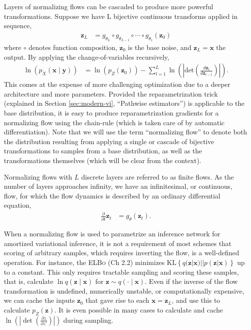 Layers of normalizing flows can be cascaded to produce more powerful transformations. Suppose we have L bijective continuous transforms applied in sequence,
\begin{align*}
	\mathbf{z}_L &= g_{\theta_L}\circ g_{\theta_{L-1}}\circ\cdots\circ g_{\theta_1}(\mathbf{z}_0)
\end{align*}
where $\circ$ denotes function composition, $\mathbf{z}_0$ is the base noise, and $\mathbf{z}_L=\mathbf{x}$ the output. By applying the change-of-variables recursively,
\begin{align*}
	\ln(p_X(\mathbf{x}\mid\mathbf{y})) &= \ln(p_Z(\mathbf{z}_0)) - \sum^L_{l=1}\ln\left(\left|\text{det}\left(\frac{d\mathbf{z}_l}{d\mathbf{z}_{l-1}}\right)\right|\right).
\end{align*}
This comes at the expense of more challenging optimization due to a deeper architecture and more parameters. Provided the reparametrization trick (explained in Section \ref{sec:modern-vi}, ``Pathwise estimators'') is applicable to the base distribution, it is easy to produce reparametrization gradients for a normalizing flow using the chain-rule (which is taken care of by automatic differentiation). Note that we will use the term ``normalizing flow'' to denote both the distribution resulting from applying a single or cascade of bijective transformations to samples from a base distribution, as well as the transformations themselves (which will be clear from the context).

Normalizing flows with $L$ discrete layers are referred to as finite flows. As the number of layers approaches infinity, we have an infinitesimal, or continuous, flow, for which the flow dynamics is described by an ordinary differential equation,
\begin{align*}
	\frac{\partial}{\partial t}\mathbf{z}_t &= g_\theta(\mathbf{z}_t).
\end{align*}

When a normalizing flow is used to parametrize an inference network for amortized variational inference, it is not a requirement of most schemes that scoring of arbitrary samples, which requires inverting the flow, is a well-defined operation. For instance, the {\scshape ELBo} (Ch 2.2) minimizes $\text{KL}\left\{q(\mathbf{z}|\mathbf{x})||p(\mathbf{z}|\mathbf{x})\right\}$ up to a constant. This only requires tractable sampling and scoring these samples, that is, calculate $\ln q(\mathbf{z}\mid\mathbf{x})$ for $\mathbf{z}\sim q(\cdot\mid\mathbf{x})$. Even if the inverse of the flow transformation is undefined, numerically unstable, or computationally expensive, we can cache the inputs $\mathbf{z}_0$ that gave rise to each $\mathbf{x}=\mathbf{z}_L$, and use this to calculate $p_Z(\mathbf{z})$. It is even possible in many cases to calculate and cache $\ln(|\det(\frac{\partial z}{\partial z'})|)$ during sampling.

